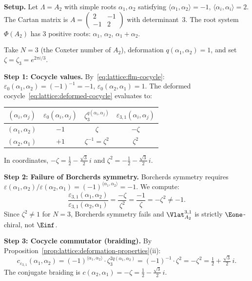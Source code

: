 \begin{computation}[\texorpdfstring{$A_2$}{A_2} at the Coxeter root: \texorpdfstring{$N = 3$}{N = 3}, \texorpdfstring{$q = 1$}{q = 1}]
\label{comp:lattice:a2-n3}

\noindent\textbf{Setup.}
Let $\Lambda = A_2$ with simple roots
$\alpha_1, \alpha_2$ satisfying
$\langle\alpha_1,\alpha_2\rangle = -1$, $\langle\alpha_i,\alpha_i\rangle = 2$.
The Cartan matrix is
$A = \left(\begin{smallmatrix}2 & -1\\-1 & 2\end{smallmatrix}\right)$
with determinant~$3$.
The root system $\Phi(A_2)$ has 3 positive roots:
$\alpha_1$, $\alpha_2$, $\alpha_1 + \alpha_2$.

Take $N = 3$ (the Coxeter number of $A_2$), deformation
$q(\alpha_1,\alpha_2) = 1$, and set $\zeta = \zeta_3 = e^{2\pi i/3}$.
\smallskip

\noindent\textbf{Step 1: Cocycle values.}
By~\eqref{eq:lattice:flm-cocycle}:
$\varepsilon_0(\alpha_1,\alpha_2) = (-1)^{-1} = -1$,
$\varepsilon_0(\alpha_2,\alpha_1) = 1$.
The deformed cocycle~\eqref{eq:lattice:deformed-cocycle}
evaluates to:
\begin{center}
\renewcommand{\arraystretch}{1.3}
\begin{tabular}{c c c c}
$(\alpha_i,\alpha_j)$
 & $\varepsilon_0(\alpha_i,\alpha_j)$
 & $\zeta_3^{q(\alpha_i,\alpha_j)}$
 & $\varepsilon_{3,1}(\alpha_i,\alpha_j)$ \\
\hline
$(\alpha_1,\alpha_2)$
 & $-1$ & $\zeta$ & $-\zeta$ \\
$(\alpha_2,\alpha_1)$
 & $+1$ & $\zeta^{-1} = \zeta^2$ & $\zeta^2$
\end{tabular}
\end{center}
In coordinates, $-\zeta = \tfrac{1}{2} - \tfrac{\sqrt{3}}{2}\,i$
and $\zeta^2 = -\tfrac{1}{2} - \tfrac{\sqrt{3}}{2}\,i$.
\smallskip

\noindent\textbf{Step 2: Failure of Borcherds symmetry.}
Borcherds symmetry requires
$\varepsilon(\alpha_1,\alpha_2)/\varepsilon(\alpha_2,\alpha_1)
= (-1)^{\langle\alpha_1,\alpha_2\rangle} = -1$.
We compute:
\[
\frac{\varepsilon_{3,1}(\alpha_1,\alpha_2)}%
 {\varepsilon_{3,1}(\alpha_2,\alpha_1)}
= \frac{-\zeta}{\zeta^2}
= \frac{-1}{\zeta}
= -\zeta^2
\neq -1.
\]
Since $\zeta^2 \neq 1$ for $N = 3$, Borcherds symmetry fails and
$\Vlat_{A_2}^{3,1}$ is strictly $\Eone$-chiral, not $\Einf$.
\smallskip

\noindent\textbf{Step 3: Cocycle commutator (braiding).}
By
Proposition~\ref{prop:lattice:deformation-properties}(ii):
\[
c_{\varepsilon_{3,1}}(\alpha_1,\alpha_2)
= (-1)^{\langle\alpha_1,\alpha_2\rangle} \cdot \zeta_3^{2q(\alpha_1,\alpha_2)}
= (-1)^{-1} \cdot \zeta^2
= -\zeta^2
= \tfrac{1}{2} + \tfrac{\sqrt{3}}{2}\,i.
\]
The conjugate braiding is
$c(\alpha_2,\alpha_1) = -\zeta = \tfrac{1}{2} - \tfrac{\sqrt{3}}{2}\,i$.
\smallskip


\end{computation}
